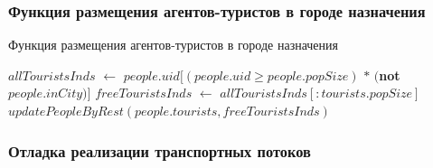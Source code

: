 \documentclass[a4paper,12pt]{article} %
\begin{document}
\subsubsection{Функция размещения агентов-туристов в городе назначения}

\begin{algorithm}[H]
\caption{Функция размещения агентов-туристов в городе назначения}
\label{alg:addtourists}
\begin{algorithmic}[1]
	\State \(allTouristsInds\) \(\gets\) \(people.uid[(people.uid \geqslant people.popSize)\) \(*\) \((\)\textbf{not} \(people.inCity)]\)
	\State \(freeTouristsInds\) \(\gets\) \(allTouristsInds[:tourists.popSize]\)
	\State \(updatePeopleByRest(people.tourists,freeTouristsInds)\)
\EndFunction
\end{algorithmic}
\end{algorithm}


\subsubsection{Отладка реализации транспортных потоков}
\end{document}
